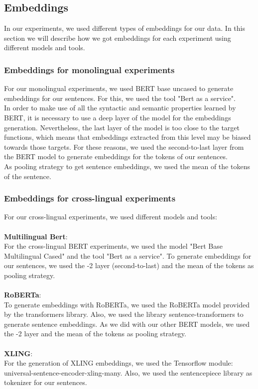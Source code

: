 \subsection{Embeddings}
In our experiments, we used different types of embeddings for our data. In this section we will describe how we got embeddings for each experiment using different models and tools.
\subsubsection{Embeddings for monolingual experiments}
For our monolingual experiments, we used BERT base uncased to generate embeddings for our sentences. For this, we used the tool "Bert as a service".\\
In order to make use of all the syntactic and semantic properties learned by BERT, it is necessary to use a deep layer of the model for the embeddings generation. Nevertheless, the last layer of the model is too close to the target functions, which means that embeddings extracted from this level may be biased towards those targets. For these reasons, we used the second-to-last layer from the BERT model to generate embeddings for the tokens of our sentences.\\
As pooling strategy to get sentence embeddings, we used the mean of the tokens of the sentence.\\
\subsubsection{Embeddings for cross-lingual experiments}
For our cross-lingual experiments, we used different models and tools:\\\\
{\bf Multilingual Bert}:\\
For the cross-lingual BERT experiments, we used the model "Bert Base Multilingual Cased" and the tool "Bert as a service". To generate embeddings for our sentences, we used the -2 layer (second-to-last) and the mean of the tokens as pooling strategy.\\\\
{\bf RoBERTa}:\\
To generate embeddings with RoBERTa, we used the RoBERTa  model provided by the transformers library. Also, we used the library sentence-transformers to generate sentence embeddings. As we did with our other BERT models, we used the -2 layer and the mean of the tokens as pooling strategy.\\\\
{\bf XLING}:\\
For the generation of XLING embeddings, we used the Tensorflow module: universal-sentence-encoder-xling-many. Also, we used the sentencepiece library as tokenizer for our sentences.
